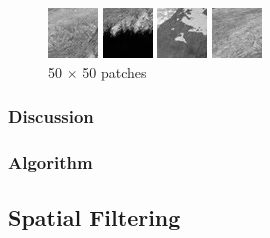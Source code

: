 \documentclass{article}
\begin{document}
\begin{figure}[H]
	\begin{minipage}[b]{0.24\linewidth}
		\centering
		\includegraphics[width=37.5pt]{../result/patch-50-50-4.png}
	\end{minipage}
	\begin{minipage}[b]{0.24\linewidth}
		\centering
		\includegraphics[width=37.5pt]{../result/patch-50-50-5.png}
	\end{minipage}
	\begin{minipage}[b]{0.24\linewidth}
		\centering
		\includegraphics[width=37.5pt]{../result/patch-50-50-6.png}
	\end{minipage}
	\begin{minipage}[b]{0.24\linewidth}
		\centering
		\includegraphics[width=37.5pt]{../result/patch-50-50-7.png}
	\end{minipage}
	\caption{50 $\times$ 50 patches}
\end{figure}


\subsubsection{Discussion}

\subsubsection{Algorithm}

\subsection{Spatial Filtering}
\end{document}
